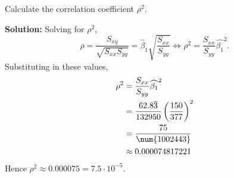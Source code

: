 Calculate the correlation coefficient $\rho^2$.

\nl \textbf{Solution: } Solving for $\rho^2$,
$$\rho = \frac{S_{xy}}{\sqrt{S_{xx}S_{yy}}} = \widehat{\beta}_1 \sqrt{\frac{S_{xx}}{S_{yy}}} \iff \rho^2 = \frac{S_{xx}}{S_{yy}} \widehat{\beta_1}^2.$$
Substituting in these values,
\begin{align*}
    \rho^2 &= \frac{S_{xx}}{S_{yy}} \widehat{\beta_1}^2\\
    &= \frac{62.8\overline3}{132950} \pfrac{150}{377}^2\\
    &= \frac{75}{\num{1002443}}\\
    &\approx 0.000074817221
\end{align*}
Hence $\rho^2 \approx 0.000075 = 7.5 \cdot 10^{-5}$.